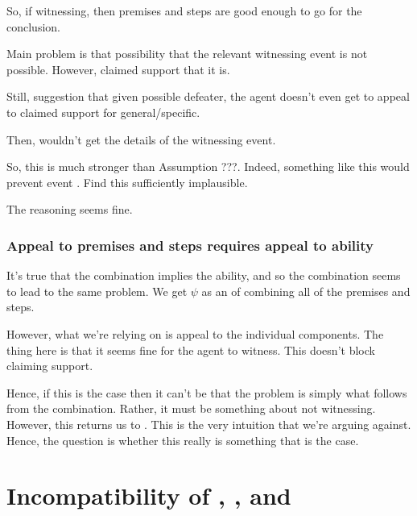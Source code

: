 \begin{note}
  So, if witnessing, then premises and steps are good enough to go for the conclusion.

  Main problem is that possibility that the relevant witnessing event is not possible.
  However, claimed support that it is.

  Still, suggestion that given possible defeater, the agent doesn't even get to appeal to claimed support for general/specific.

  Then, wouldn't get the details of the witnessing event.

  So, this is much stronger than {\color{red} Assumption ???}.
  Indeed, something like this would prevent event \ESU{}.
  Find this sufficiently implausible.

  The reasoning seems fine.
\end{note}

\subsubsection{Appeal to premises and steps requires appeal to ability}

\begin{note}
  It's true that the combination implies the ability, and so the combination seems to lead to the same problem.
  We get \(\psi\) as an \requ{} of combining all of the premises and steps.

  However, what we're relying on is appeal to the individual components.
  The thing here is that it seems fine for the agent to witness.
  This doesn't block claiming support.

  Hence, if this is the case then it can't be that the problem is simply what follows from the combination.
  Rather, it must be something about not witnessing.
  However, this returns us to \ESU{}.
  This is the very intuition that we're arguing against.
  Hence, the question is whether this really is something that is the case.
\end{note}

\section{Incompatibility of \nI{}, \gsi{}, and \adA{}}
\label{sec:ni-summary}

\begin{note}[Table]
    \begin{figure}[h]
      \centering
      \saMtxRuledOutLCS{}
  \end{figure}
\end{note}

